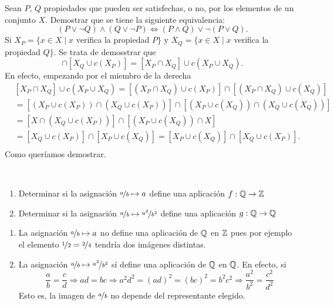 \documentclass[12pt]{article}
\begin{document}
    \begin{ejercicio}[1.25 puntos]
        Sean $P$, $Q$ propiedades que pueden ser satisfechas, o no, por los elementos 
        de un conjunto $X$. Demostrar que se tiene la siguiente equivalencia:
        \begin{equation*}
            (P\lor\lnot Q) \land (Q \lor \lnot P) \Leftrightarrow (P \land Q) \lor \lnot(P \lor Q).
        \end{equation*}
        Si $X_P = \{x \in X \mid x$ verifica la propiedad $P\}$ y $X_Q = \{x \in X \mid x$ verifica la propiedad $Q\}$. Se trata de demosstrar que
        \begin{equation*}
            [X_P \cup c(X_Q)] \cap [X_Q \cup c(X_P)] = [X_P \cap X_Q] \cup c(X_P \cup X_Q).
        \end{equation*}
        En efecto, empezando por el miembro de la derecha
        \begin{align*}
            & [X_P \cap X_Q] \cup c(X_P \cup X_Q) = [(X_P \cap X_Q) \cup c(X_P)] \cap [(X_P \cap X_Q) \cup c(X_Q)] \\
            & = [(X_P \cup c(X_P)) \cap (X_Q \cup c(X_P))] \cap [(X_P \cup c(X_Q)) \cap (X_Q \cup c(X_Q))] \\
            & = [X \cap (X_Q \cup c(X_P))] \cap [(X_P \cup c(X_Q)) \cap X] \\
            & = [X_Q \cup c(X_P)] \cap [X_P \cup c(X_Q)] = [X_P \cup c(X_Q)] \cap [X_Q \cup c(X_P)]. \\
        \end{align*}
        Como queríamos demostrar.
    \end{ejercicio}
    \begin{ejercicio}[1.25 puntos]~
        \begin{enumerate}[label=(\roman*)]
            \item Determinar si la asignación $\nicefrac{a}{b} \mapsto a$ define una aplicación $f: {\mathbb{Q}} \rightarrow {\mathbb{Z}}$
            \item Determinar si la asignación $\nicefrac{a}{b} \mapsto \nicefrac{a^2}{b^2}$ define una aplicación $g: {\mathbb{Q}} \rightarrow {\mathbb{Q}}$
        \end{enumerate}
        \begin{enumerate}[label=(\roman*)]
            \item La asignación $\nicefrac{a}{b} \mapsto a$ no define una aplicación de ${\mathbb{Q}}$ en ${\mathbb{Z}}$ pues por ejemplo el elemento $\nicefrac{1}{2} = \nicefrac{2}{4}$ tendría dos imágenes distintas.
            \item La asignación $\nicefrac{a}{b} \mapsto \nicefrac{a^2}{b^2}$ sí define una aplicación de ${\mathbb{Q}}$ en ${\mathbb{Q}}$. En efecto, si
            \begin{equation*}
                \frac{a}{b} = \frac{c}{d} \Rightarrow ad = bc \Rightarrow a^2d^2 = (ad)^2 = (bc)^2 = b^2c^2 \Rightarrow \frac{a^2}{b^2} = \frac{c^2}{d^2}
            \end{equation*}
            Esto es, la imagen de $\nicefrac{a}{b}$ no depende del representante elegido.
        \end{enumerate}
    \end{ejercicio}
\end{document}
